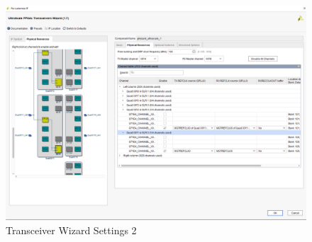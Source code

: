 \documentclass[oneside]{discothesis}
\begin{document}
\begin{figure}[t]
    \centering
    \hspace*{-2cm}\includegraphics[width=1.3\linewidth]{img/transceiver2.png}
    \caption{Transceiver Wizard Settings 2}%
    \label{fig:transceiver2}
\end{figure}

\cleardoublepage
\end{document}

